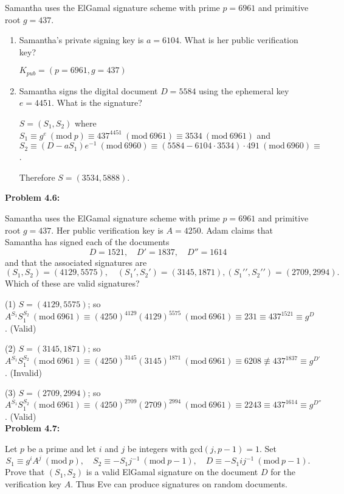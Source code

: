 \documentclass[a4paper, 11pt]{article}
\newcommand{\Mod}[1]{\ (\mathrm{mod}\ #1)}
\begin{document}
    Samantha uses the ElGamal signature scheme with prime $p = 6961$ and primitive root $g = 437$.
    \begin{enumerate}[label=(\alph*)]
        \item Samantha’s private signing key is $a = 6104$. What is her public verification key?
        
        $K_{pub} = (p=6961,g=437)$
        \item Samantha signs the digital document $D = 5584$ using the ephemeral key $e = 4451$. What is the signature?
        
        $S = (S_1, S_2)$ where $S_1\equiv g^e\Mod{p}\equiv437^{4451}\Mod{6961}\equiv 3534 \Mod{6961}$ and $S_2 \equiv (D-aS_1)e^{-1} \Mod{6960} \equiv (5584 - 6104\cdot 3534)\cdot 491 \Mod{6960} \equiv $.
        
        Therefore $S=(3534,5888)$.
    \end{enumerate}
    
\noindent\textbf{Problem 4.6:}
    
    Samantha uses the ElGamal signature scheme with prime $p = 6961$ and primitive root $g = 437$. Her public verification key is $A = 4250$. Adam claims that Samantha has signed each of the documents
    $$D=1521, \quad D'=1837,\quad D''=1614$$
    and that the associated signatures are
    $$(S_1, S_2) = (4129, 5575),\quad  (S_1′ , S_2′ ) = (3145, 1871), (S_1′′, S_2′′) = (2709, 2994).$$
    Which of these are valid signatures?
    
    (1) $S=(4129, 5575)$; so $A^{S_1}S_1^{S_2} \Mod{6961}\equiv (4250)^{4129}(4129)^{5575}\Mod{6961}\equiv 231 \equiv 437^{1521} \equiv g^D$. (Valid)
    
    (2) $S=(3145, 1871)$; so $A^{S_1}S_1^{S_2} \Mod{6961}\equiv (4250)^{3145}(3145)^{1871}\Mod{6961}\equiv 6208 \not\equiv 437^{1837} \equiv g^{D'}$. (Invalid) 
    
    (3) $S=(2709, 2994)$; so $A^{S_1}S_1^{S_2} \Mod{6961}\equiv (4250)^{2709}(2709)^{2994}\Mod{6961}\equiv 2243 \equiv 437^{1614} \equiv g^{D''}$. (Valid)\\
    
\noindent\textbf{Problem 4.7:}
    
    Let $p$ be a prime and let $i$ and $j$ be integers with gcd$(j,p-1) = 1$. Set
    $$S_1 \equiv g^iA^j \Mod{p},\quad S_2 \equiv -S_1j^{-1} \Mod{p-1},\quad D \equiv -S_1ij^{-1} \Mod{p-1}.$$
    Prove that $(S_1,S_2)$ is a valid ElGamal signature on the document $D$ for the verification key $A$. Thus Eve can produce signatures on random documents.
    
\end{document}
